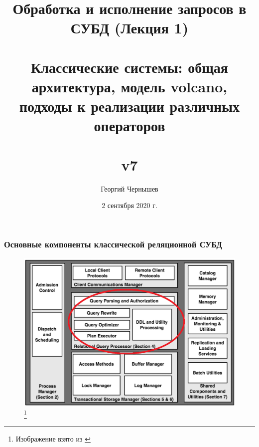 \documentclass{beamer}
\title[Обработка и исполнение запросов: лекция 1]{Обработка и исполнение запросов в СУБД (Лекция 1) \\~\\ Классические системы: общая архитектура, модель volcano, подходы к реализации различных операторов \\~\\ v7} %
\author{Георгий Чернышев} %
\institute[ВШЭ] %
{
Высшая Школа Экономики \\ %
\medskip
\textit{chernishev@gmail.com} %
}
\date{2 сентября 2020 г.}
\begin{document}
\begin{frame}
\titlepage %
\end{frame}

\begin{frame}
\frametitle{Основные компоненты классической реляционной СУБД}

\begin{figure}[htb]
\includegraphics[width=\textwidth,height=0.75\textheight,keepaspectratio]{overall-schema.png} 
\footnote{\tiny{Изображение взято из \cite{Hellerstein2007}}}
\end{figure}
\end{frame}
\end{document}
